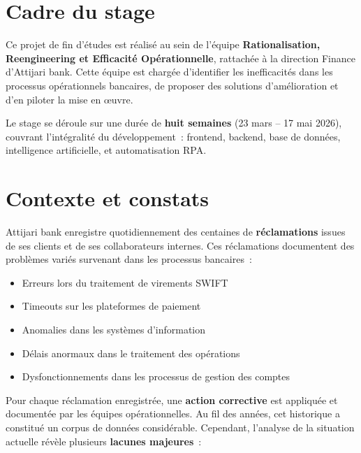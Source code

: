 \documentclass[12pt,a4paper]{report}
\begin{document}
\section{Cadre du stage}

Ce projet de fin d'études est réalisé au sein de l'équipe \textbf{Rationalisation, Reengineering et Efficacité Opérationnelle}, rattachée à la direction Finance d'Attijari bank. Cette équipe est chargée d'identifier les inefficacités dans les processus opérationnels bancaires, de proposer des solutions d'amélioration et d'en piloter la mise en \oe uvre.

Le stage se déroule sur une durée de \textbf{huit semaines} (23 mars -- 17 mai 2026), couvrant l'intégralité du développement~: frontend, backend, base de données, intelligence artificielle, et automatisation RPA.

\section{Contexte et constats}

Attijari bank enregistre quotidiennement des centaines de \textbf{réclamations} issues de ses clients et de ses collaborateurs internes. Ces réclamations documentent des problèmes variés survenant dans les processus bancaires~:

\begin{itemize}[noitemsep]
    \item Erreurs lors du traitement de virements SWIFT
    \item Timeouts sur les plateformes de paiement
    \item Anomalies dans les systèmes d'information
    \item Délais anormaux dans le traitement des opérations
    \item Dysfonctionnements dans les processus de gestion des comptes
\end{itemize}

Pour chaque réclamation enregistrée, une \textbf{action corrective} est appliquée et documentée par les équipes opérationnelles. Au fil des années, cet historique a constitué un corpus de données considérable. Cependant, l'analyse de la situation actuelle révèle plusieurs \textbf{lacunes majeures}~:
\end{document}
